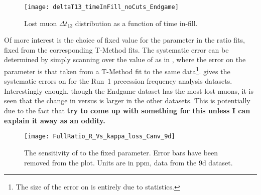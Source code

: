 \begin{figure}[]
    \centering
    \texttt{[image: deltaT13\_timeInFill\_noCuts\_Endgame]}
    \caption[Lost muon $\Delta t_{13}$ distribution as a function of time in-fill]{Lost muon $\Delta t_{13}$ distribution as a function of time in-fill.}
    \label{fig:deltaT13}
\end{figure}



Of more interest is the choice of fixed value for the \K parameter in the ratio fits, fixed from the corresponding T-Method fits. The systematic error can be determined by simply scanning over the value of \K as in , where the error on the parameter is that taken from a T-Method fit to the same data\footnote{The size of the error on \K is entirely due to statistics.}.  gives the systematic errors on \R for the Run~1 precession frequency analysis datasets. Interestingly enough, though the Endgame dataset has the most lost muons, it is seen that the change in \R versus \K is larger in the other datasets. This is potentially due to the fact that \textbf{try to come up with something for this unless I can explain it away as an oddity.}


\begin{figure}[]
    \centering
    \texttt{[image: FullRatio\_R\_Vs\_kappa\_loss\_Canv\_9d]}
    \caption[Scan over fixed \K]{The sensitivity of \R to the fixed \K parameter. Error bars have been removed from the plot. Units are in ppm, data from the 9d dataset.}
    \label{fig:kappaLossScan}
\end{figure}


